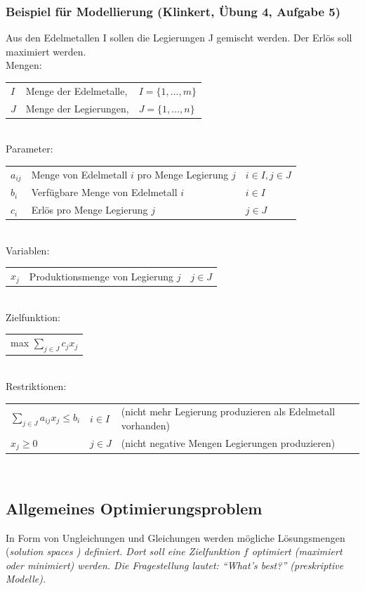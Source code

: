   \subsubsection{Beispiel für Modellierung (Klinkert, Übung 4, Aufgabe 5)}
  Aus den Edelmetallen I sollen die Legierungen J gemischt werden. Der Erlös soll maximiert werden.\\
  Mengen:\\
  \begin{tabular}{lll}
    $I$ & Menge der Edelmetalle, &$I = \{1, \ldots, m\}$\\
    $J$ & Menge der Legierungen, &$J = \{1, \ldots, n\}$
  \end{tabular}\\
  Parameter:\\
  \begin{tabular}{lll}
    $a_{ij}$ & Menge von Edelmetall $i$ pro Menge Legierung $j$ & $i \in I, j \in J$\\
    $b_i$    & Verfügbare Menge von Edelmetall $i$              & $i \in I$\\
    $c_i$    & Erlös pro Menge Legierung $j$                    & $j \in J$\\
  \end{tabular}\\
  Variablen:\\
  \begin{tabular}{lll}
    $x_j$ & Produktionsmenge von Legierung $j$ & $j \in J$\\
  \end{tabular}\\
  Zielfunktion:\\
  \begin{tabular}{l}
    max $\sum_{j \in J}c_j x_j$\\
  \end{tabular}\\
  Restriktionen:\\
  \begin{tabular}{lll}
    $\sum_{j \in J}a_{ij}x_j \le b_i$ & $i \in I$ & (nicht mehr Legierung produzieren als Edelmetall vorhanden)\\
    $x_j \ge 0$                       & $j \in J$ & (nicht negative Mengen Legierungen produzieren)
  \end{tabular}\\




\subsection{Allgemeines Optimierungsproblem }
  In Form von Ungleichungen und Gleichungen werden mögliche Lösungsmengen (\em solution spaces \em) definiert. Dort soll eine Zielfunktion $f$ optimiert (maximiert oder minimiert) werden. Die Fragestellung lautet: "`What's best?"' (preskriptive Modelle).
  
